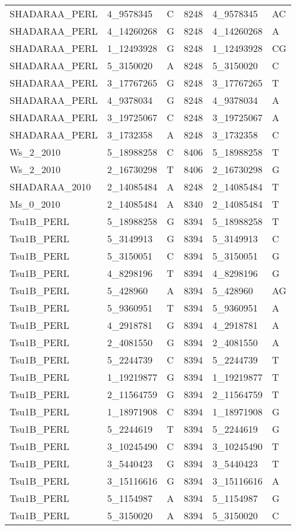\begin{center}
\begin{longtable}{|l|l|l|l|l|l|}
SHADARAA\_PERL&4\_9578345&C&8248&4\_9578345&AC\\
SHADARAA\_PERL&4\_14260268&G&8248&4\_14260268&A\\
SHADARAA\_PERL&1\_12493928&G&8248&1\_12493928&CG\\
SHADARAA\_PERL&5\_3150020&A&8248&5\_3150020&C\\
SHADARAA\_PERL&3\_17767265&G&8248&3\_17767265&T\\
SHADARAA\_PERL&4\_9378034&G&8248&4\_9378034&A\\
SHADARAA\_PERL&3\_19725067&C&8248&3\_19725067&A\\
SHADARAA\_PERL&3\_1732358&A&8248&3\_1732358&C\\
Ws\_2\_2010&5\_18988258&C&8406&5\_18988258&T\\
Ws\_2\_2010&2\_16730298&T&8406&2\_16730298&G\\
SHADARAA\_2010&2\_14085484&A&8248&2\_14085484&T\\
Ms\_0\_2010&2\_14085484&A&8340&2\_14085484&T\\
Tsu1B\_PERL&5\_18988258&G&8394&5\_18988258&T\\
Tsu1B\_PERL&5\_3149913&G&8394&5\_3149913&C\\
Tsu1B\_PERL&5\_3150051&C&8394&5\_3150051&G\\
Tsu1B\_PERL&4\_8298196&T&8394&4\_8298196&G\\
Tsu1B\_PERL&5\_428960&A&8394&5\_428960&AG\\
Tsu1B\_PERL&5\_9360951&T&8394&5\_9360951&A\\
Tsu1B\_PERL&4\_2918781&G&8394&4\_2918781&A\\
Tsu1B\_PERL&2\_4081550&G&8394&2\_4081550&A\\
Tsu1B\_PERL&5\_2244739&C&8394&5\_2244739&T\\
Tsu1B\_PERL&1\_19219877&G&8394&1\_19219877&T\\
Tsu1B\_PERL&2\_11564759&G&8394&2\_11564759&T\\
Tsu1B\_PERL&1\_18971908&C&8394&1\_18971908&G\\
Tsu1B\_PERL&5\_2244619&T&8394&5\_2244619&G\\
Tsu1B\_PERL&3\_10245490&C&8394&3\_10245490&T\\
Tsu1B\_PERL&3\_5440423&G&8394&3\_5440423&T\\
Tsu1B\_PERL&3\_15116616&G&8394&3\_15116616&A\\
Tsu1B\_PERL&5\_1154987&A&8394&5\_1154987&G\\
Tsu1B\_PERL&5\_3150020&A&8394&5\_3150020&C\\

\end{longtable}
\end{center}
